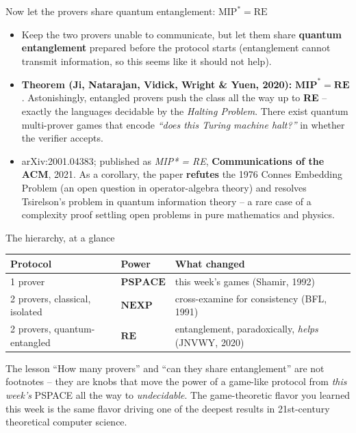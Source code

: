 \documentclass[11pt,aspectratio=169]{beamer}
\begin{document}
\begin{frame}{Now let the provers share quantum entanglement: $\text{MIP}^*=\text{RE}$}
  \small
  \begin{itemize}
    \item Keep the two provers unable to communicate, but let them share
    \textbf{quantum entanglement} prepared before the protocol starts (entanglement
    cannot transmit information, so this seems like it should not help).
    \item \textbf{Theorem (Ji, Natarajan, Vidick, Wright \& Yuen, 2020):}
    $\mathbf{MIP}^{*} = \mathbf{RE}$. Astonishingly, entangled provers push the class
    all the way up to \textbf{RE} -- exactly the languages decidable by the
    \emph{Halting Problem}. There exist quantum multi-prover games that encode
    \emph{``does this Turing machine halt?''} in whether the verifier accepts.
    \item arXiv:2001.04383; published as \emph{MIP* = RE}, \textbf{Communications of
    the ACM}, 2021. As a corollary, the paper \textbf{refutes} the 1976 Connes
    Embedding Problem (an open question in operator-algebra theory) and resolves
    Tsirelson's problem in quantum information theory -- a rare case of a complexity
    proof settling open problems in pure mathematics and physics.
  \end{itemize}
\end{frame}

\begin{frame}{The hierarchy, at a glance}
  \small
  \begin{center}
  \begin{tabular}{@{}lll@{}}
    \toprule
    Protocol & Power & What changed \\
    \midrule
    1 prover & $\mathbf{PSPACE}$ & this week's games (Shamir, 1992) \\
    2 provers, classical, isolated & $\mathbf{NEXP}$ & cross-examine for consistency
    (BFL, 1991) \\
    2 provers, quantum-entangled & $\mathbf{RE}$ & entanglement, paradoxically,
    \emph{helps} (JNVWY, 2020) \\
    \bottomrule
  \end{tabular}
  \end{center}
  \begin{exampleblock}{The lesson}
    ``How many provers'' and ``can they share entanglement'' are not footnotes -- they
    are knobs that move the power of a game-like protocol from \emph{this week's}
    PSPACE all the way to \emph{undecidable}. The game-theoretic flavor you learned
    this week is the same flavor driving one of the deepest results in 21st-century
    theoretical computer science.
  \end{exampleblock}
\end{frame}
\end{document}
